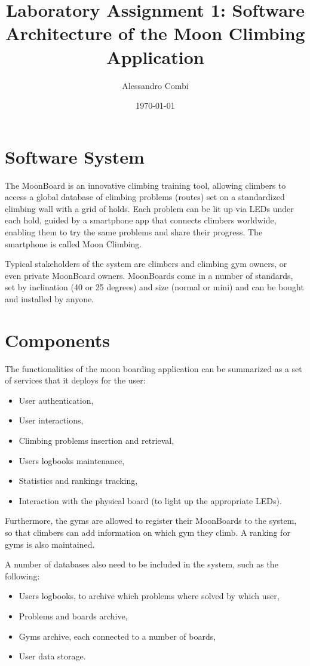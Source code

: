 \documentclass{article}
\title{Laboratory Assignment 1: Software Architecture of the Moon Climbing Application}
\author{Alessandro Combi}
\date{\today}
\begin{document}
\maketitle
\newpage

\tableofcontents
\newpage

\section{Software System}%

The MoonBoard is an innovative climbing training tool, allowing climbers to access a global database of climbing problems (routes) set on a standardized climbing wall with a grid of holds. 
Each problem can be lit up via LEDs under each hold, guided by a smartphone app that connects climbers worldwide, enabling them to try the same problems and share their progress. 
The smartphone is called Moon Climbing.

Typical stakeholders of the system are climbers and climbing gym owners, or even private MoonBoard owners. 
MoonBoards come in a number of standards, set by inclination (40 or 25 degrees) and size (normal or mini) and can be bought and installed by anyone.

\section{Components}\label{sec:components}
The functionalities of the moon boarding application can be summarized as a set of services that it deploys for the user:
\begin{itemize}
    \item User authentication,
    \item User interactions,
    \item Climbing problems insertion and retrieval,
    \item Users logbooks maintenance,
    \item Statistics and rankings tracking,
    \item Interaction with the physical board (to light up the appropriate LEDs).
\end{itemize}

Furthermore, the gyms are allowed to register their MoonBoards to the system, so that climbers can add information on which gym they climb. 
A ranking for gyms is also maintained.

A number of databases also need to be included in the system, such as the following:
\begin{itemize}
    \item Users logbooks, to archive which problems where solved by which user,
    \item Problems and boards archive,
    \item Gyms archive, each connected to a number of boards,
    \item User data storage.
\end{itemize}
\end{document}
